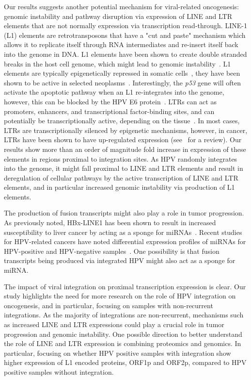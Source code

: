 \documentclass[12pt]{article}
\begin{document}
Our results suggests another potential mechanism for viral-related oncogenesis: genomic instability and pathway disruption via expression of LINE and LTR elements that are not normally expression via transcription read-through.  LINE-1 (L1) elements are retrotransposons that have a "cut and paste" mechanism which allows it to replicate itself through RNA intermediates and re-insert itself back into the genome in DNA.  L1 elements have been shown to create double stranded breaks in the host cell genome, which might lead to genomic instability~\cite{Gasior2006}.  L1 elements are typically epigenetically repressed in somatic cells~\cite{Kinomoto2007,Sigurdsson2012}, they have been shown to be active in selected neoplasms~\cite{Rodic2013,Xiao-Jie2016}.  Interestingly, the \emph{p53} gene will often activate the apoptotic pathway when an L1 re-integrates into the genome, however, this can be blocked by the HPV E6 protein~\cite{Haoudi2004}.  LTRs can act as promoters, enhancers, and transcriptional factor-binding sites, and can potentially be transcriptionally active, depending on the tissue~\cite{Yu2013}.  In most cases, LTRs are transcriptionally silenced by epigenetic mechanisms, however, in cancer, LTRs have been shown to have up-regulated expression (see~\cite{Romanish2010} for a review).  Our results show more than an order of magnitude fold increase in expression of these elements in regions proximal to integration sites.  As HPV randomly integrates into the genome, it might fall proximal to LINE and LTR elements and result in deregulation of cellular pathways by the active transcription of LINE and LTR elements, and in particular increased genomic instability via production of L1 elements.  

The production of fusion transcripts might also play a role in tumor progression.  As previously noted, HBx-LINE1 has been shown to result in increased susceptibility to liver cancer by acting as a sponge for miRNAs~\cite{Lau2014,Liang2016}.  Recent studies for HPV-related cancers have noted differential expression profiles of miRNAs for HPV-positive and HPV-negative samples~\cite{Lajer2012,Gao2016}.  One possibility is that fusion transcripts being produced via integrated HPV might also act as a sponge for miRNA.

The impact of viral integration on proximal transcription expression is clear.  Our study highlights the need for more research on the role of HPV integration on oncogenesis, and in particular, focusing on samples with non-recurrent integrations.  As the majority of integrations are non-recurrent, mechanisms such as increased LINE and LTR expressions could play a crucial role in tumor progression and genomic instability.  One possible direction to better understand the role of LINE and LTR expression is combining proteomics and genomics.  In particular, focusing on whether HPV positive samples with integration show higher expression of L1 encoded proteins, ORF1p and ORF2p, compared to HPV positive samples without integration.  
 
\end{document}
